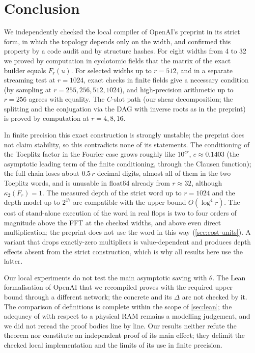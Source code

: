 \documentclass[11pt]{article}
\theoremstyle{plain}
\begin{document}
\section{Conclusion}\label{sec:conclusion}
We independently checked the local compiler of OpenAI's preprint in its strict form, in which the topology depends only on the width, and confirmed this property by a code audit and by structure hashes. For eight widths from 4 to 32 we proved by computation in cyclotomic fields that the matrix of the exact builder equals $F_r(u)$. For selected widths up to $r=512$, and in a separate streaming test at $r=1024$, exact checks in finite fields give a necessary condition (by sampling at $r=255,256,512,1024$), and high-precision arithmetic up to $r=256$ agrees with equality. The $C$-slot path (our shear decomposition; the splitting and the conjugation via the DAG with inverse roots as in the preprint) is proved by computation at $r=4,8,16$.

In finite precision this exact construction is strongly unstable; the preprint does not claim stability, so this contradicts none of its statements. The conditioning of the Toeplitz factor in the Fourier case grows roughly like $10^{cr}$, $c\approx0.1403$ (the asymptotic leading term of the finite conditioning, through the Clausen function); the full chain loses about $0.5\,r$ decimal digits, almost all of them in the two Toeplitz words, and is unusable in float64 already from $r\approx32$, although $\kappa_2(F_r)=1$. The measured depth of the strict word up to $r=1024$ and the depth model up to $2^{17}$ are compatible with the upper bound $O(\log^4 r)$. The cost of stand-alone execution of the word in real flops is two to four orders of magnitude above the FFT at the checked widths, and above even direct multiplication; the preprint does not use the word in this way (\cref{sec:cost-units}). A variant that drops exactly-zero multipliers is value-dependent and produces depth effects absent from the strict construction, which is why all results here use the latter.

Our local experiments do not test the main asymptotic saving with $\theta$. The Lean formalisation of OpenAI that we recompiled proves  with the required upper bound through a different network; the concrete  and its $\Delta$ are not checked by it. The comparison of definitions is complete within the scope of \cref{sec:lean}; the adequacy of  with respect to a physical RAM remains a modelling judgement, and we did not reread the proof bodies line by line. Our results neither refute the theorem nor constitute an independent proof of its main effect; they delimit the checked local implementation and the limits of its use in finite precision.
\end{document}
